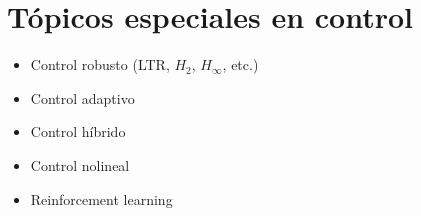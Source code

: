 

\section{Tópicos especiales en control}

\begin{itemize}
    \item Control robusto (LTR, $H_2$, $H_\infty$, etc.)
    \item Control adaptivo
    \item Control híbrido
    \item Control nolineal
    \item Reinforcement learning
\end{itemize}

